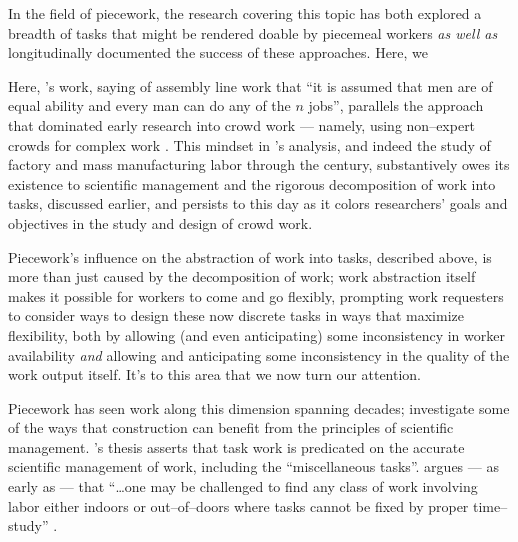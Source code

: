 \documentclass[trackingWork]{subfiles}
\begin{document}
In the field of piecework,
the research covering this topic has both explored
a breadth of tasks that might be rendered doable by piecemeal workers
\textit{as well as} longitudinally documented the success of these approaches.
Here, we 













Here, \citeauthor{hu1961parallel}'s work,
saying of assembly line work that
``it is assumed that men are of equal ability and every man can do any of the $n$ jobs'',
parallels the approach that dominated early research into crowd work
--- namely, using non--expert crowds for complex work
\cite{hu1961parallel}.
This mindset in \citeauthor{hu1961parallel}'s analysis,
and indeed the study of factory and mass manufacturing labor through the  century,
substantively owes its existence to scientific management
and the rigorous decomposition of work into tasks, discussed earlier,
and persists to this day as it colors
researchers' goals and objectives in the study and design of crowd work.

Piecework's influence on the abstraction of work into tasks,
described above, is more than just caused by the decomposition of work;
work abstraction itself makes it possible for workers to come and go flexibly,
prompting work requesters to consider ways to design these now discrete tasks in ways that
maximize flexibility, both by allowing (and even anticipating) some inconsistency in worker availability
\textit{and} allowing and anticipating some inconsistency in the quality of the work output itself.
It's to this area that we now turn our attention.






















Piecework has seen work along this dimension spanning decades;
\citeauthor{thompson1913time} investigate some of the ways that
construction can benefit from the principles of scientific management.
\citeauthor{thompson1913time}'s thesis asserts that
task work is predicated on the accurate scientific management of work,
including the ``miscellaneous tasks''.
\citeauthor{thompson1913time} argues
--- as early as \citeyear{thompson1913time} ---
that ``\dots one may be challenged to find any class of work
involving labor either indoors or out--of--doors
where tasks cannot be fixed by proper time--study''
\cite{thompson1913time}.
\end{document}
